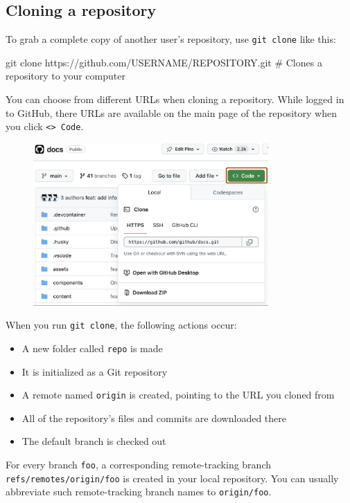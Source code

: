 \subsection{Cloning a repository}
To grab a complete copy of another user's repository, use \texttt{git clone} like this:
\begin{codeblock}[language=bash]    
git clone https://github.com/USERNAME/REPOSITORY.git 
# Clones a repository to your computer
\end{codeblock}

You can choose from different URLs when cloning a repository. While logged in to GitHub, there URLs are available on the main page of the repository when you click \texttt{<> Code}.

\begin{figure}[H]
    \centering
    \includegraphics[width=0.8\textwidth]{assets/fig1.png}
\end{figure}

When you run \texttt{git clone}, the following actions occur: 
\begin{itemize}
    \item A new folder called \texttt{repo} is made
    \item It is initialized as a Git repository
    \item A remote named \texttt{origin} is created, pointing to the URL you cloned from  
    \item All of the repository's files and commits are downloaded there 
    \item The default branch is checked out 
\end{itemize}

For every branch \texttt{foo}, a corresponding remote-tracking branch \texttt{refs/remotes/origin/foo} is created in your local repository. You can usually abbreviate such remote-tracking branch names to \texttt{origin/foo}.

